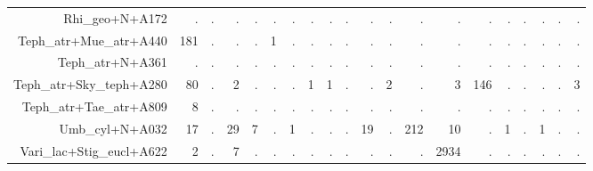 \documentclass[a4paper, 11]{article}\usepackage[]{graphicx}\usepackage[]{color}
\begin{document}
\begin{table}
\begin{tabular}{rrrrrrrrrrrrrrrrrrrr}
  Rhi\_geo+N+A172 & . & . & . & . & . & . & . & . & . & . & . & . & . & . & . & . & . & . & . \\ 
  Teph\_atr+Mue\_atr+A440 & 181 & . & . & . & 1 & . & . & . & . & . & . & . & . & . & . & . & . & . & . \\ 
  Teph\_atr+N+A361 & . & . & . & . & . & . & . & . & . & . & . & . & . & . & . & . & . & . & . \\ 
  Teph\_atr+Sky\_teph+A280 & 80 & . & 2 & . & . & . & 1 & 1 & . & . & 2 & . & 3 & 146 & . & . & . & . & 3 \\ 
  Teph\_atr+Tae\_atr+A809 & 8 & . & . & . & . & . & . & . & . & . & . & . & . & . & . & . & . & . & . \\ 
  Umb\_cyl+N+A032 & 17 & . & 29 & 7 & . & 1 & . & . & . & 19 & . & 212 & 10 & . & 1 & . & 1 & . & . \\ 
  Vari\_lac+Stig\_eucl+A622 & 2 & . & 7 & . & . & . & . & . & . & . & . & . & 2934 & . & . & . & . & . & . \\ 
   \hline
\end{tabular}
\end{table}
\end{document}
